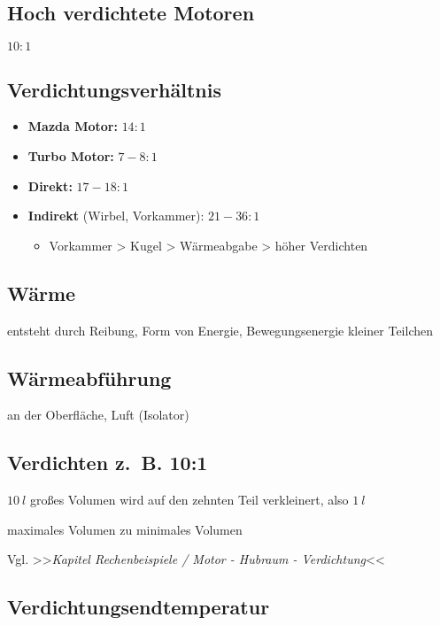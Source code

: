 \subsection{Hoch verdichtete Motoren}\label{hoch-verdichtete-motoren}

$10:1$

\subsection{Verdichtungsverhältnis}\label{verdichtungsverhaeltnis}

\begin{itemize}
\item
  \textbf{Mazda Motor:} $14:1$
\item
  \textbf{Turbo Motor:} $7 - 8:1$
\item
  \textbf{Direkt:} $17 - 18:1$
\item
  \textbf{Indirekt} (Wirbel, Vorkammer): $21 - 36:1$

  \begin{itemize}
  \item
    Vorkammer > Kugel > Wärmeabgabe
    > höher Verdichten
  \end{itemize}
\end{itemize}

\subsection{Wärme}\label{waerme}

entsteht durch Reibung, Form von Energie, Bewegungsenergie kleiner
Teilchen

\subsection{Wärmeabführung}\label{waermeabfuehrung}

an der Oberfläche, Luft (Isolator)

\subsection{Verdichten z.~B. 10:1}\label{verdichten-z.-b.-101}

$10~l$ großes Volumen wird auf den zehnten Teil verkleinert, also
$1~l$

maximales Volumen zu minimales Volumen

Vgl. >>\emph{Kapitel Rechenbeispiele / Motor - Hubraum - Verdichtung}<<

\subsection{Verdichtungsendtemperatur}\label{verdichtungsendtemperatur}

